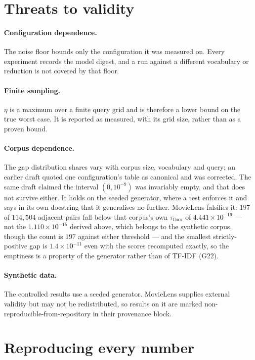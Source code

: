 \documentclass[11pt,a4paper]{article}
\theoremstyle{plain} \newtheorem{proposition}{Proposition} \theoremstyle{remark}
\newcommand{\addendum}[1]{\textsf{G#1}}
\begin{document}
\section{Threats to validity}

\paragraph{Configuration dependence.} The noise floor bounds only the
configuration it was measured on. Every experiment records the model digest, and
a run against a different vocabulary or reduction is not covered by that floor.

\paragraph{Finite sampling.} $\eta$ is a maximum over a finite query grid and is
therefore a lower bound on the true worst case. It is reported as measured, with
its grid size, rather than as a proven bound.

\paragraph{Corpus dependence.} The gap distribution shares vary with corpus
size, vocabulary and query; an earlier draft quoted one configuration's table as
canonical and was corrected. The same draft claimed the interval $(0, 10^{-9})$
was invariably empty, and that does not survive either. It holds on the seeded
generator, where a test enforces it and says in its own docstring that it
generalises no further. MovieLens falsifies it: $197$ of $114{,}504$ adjacent
pairs fall below that corpus's own $\tau_{\text{floor}}$ of
$4.441\times10^{-16}$ --- not the $1.110\times10^{-15}$ derived above, which
belongs to the synthetic corpus, though the count is $197$ against either
threshold --- and the smallest strictly-positive gap is $1.4\times10^{-11}$ even
with the scores recomputed exactly, so the emptiness is a property of the
generator rather than of TF-IDF (\addendum{22}).

\paragraph{Synthetic data.} The controlled results use a seeded generator.
MovieLens supplies external validity but may not be redistributed, so results on
it are marked non-reproducible-from-repository in their provenance block.

\section{Reproducing every number}
\end{document}
